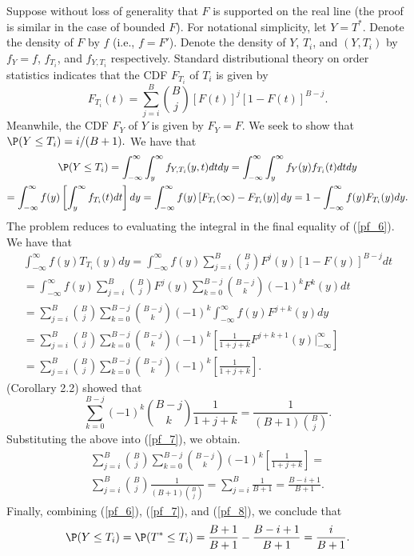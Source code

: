\documentclass[12pt]{article}
\begin{document}
Suppose without loss of generality that $F$ is supported on the real line (the proof is similar in the case of bounded $F$).  For notational simplicity, let $Y = T^*$. Denote the density of $F$ by $f$ (i.e., $f = F'$). Denote the density of $Y$, $T_i$, and $(Y,T_i)$ by $f_Y = f$, $f_{T_i}$, and $f_{Y, T_i}$ respectively. Standard distributional theory on order statistics indicates that the CDF $F_{T_i}$ of $T_i$ is given by $$ F_{T_i}(t) = \sum_{j=i}^B \binom{B}{j}[F(t)]^j [1 - F(t)]^{B-j}.$$ Meanwhile, the CDF $F_Y$ of $Y$ is given by $F_Y = F$. We seek to show that $\P(Y \leq T_i) = i/(B+1).$ We have that
\begin{multline}\label{pf_6}
\P(Y \leq T_i) = \int_{-\infty}^{\infty} \int_{y}^\infty f_{Y,T_i}(y,t) dt dy = \int_{-\infty}^{\infty} \int_{y}^\infty f_Y(y)f_{T_i}(t) dt dy \\ = \int_{-\infty}^\infty f(y) \left[\int_{y}^\infty f_{T_i}(t) dt \right] dy = \int_{-\infty}^\infty f(y) \left[ F_{T_i}(\infty) - F_{T_i}(y) \right] dy = 1 - \int_{-\infty}^\infty f(y) F_{T_i}(y)dy. 
\end{multline}
The problem reduces to evaluating the integral in the final equality of (\ref{pf_6}). We have that
\begin{multline}\label{pf_7}
\int_{-\infty}^\infty f(y) T_{T_i}(y) dy = \int_{-\infty}^\infty f(y) \sum_{j=i}^B \binom{B}{j}F^j(y) [1 - F(y)]^{B-j}dt \\ = \int_{-\infty}^\infty f(y) \sum_{j=i}^B \binom{B}{j} F^j(y) \sum_{k=0}^{B-j}\binom{B-j}{k} (-1)^k F^k(y) dt\\ = \sum_{j=i}^B \binom{B}{j} \sum_{k=0}^{B-j} \binom{B-j}{k}(-1)^k\int_{-\infty}^\infty f(y) F^{j+k}(y) dy \\ = \sum_{j=i}^B \binom{B}{j} \sum_{k=0}^{B-j} \binom{B-j}{k} (-1)^k \left[ \frac{1}{1+j+k} F^{j+k+1}(y)|^\infty_{-\infty} \right] \\ = \sum_{j=i}^B \binom{B}{j} \sum_{k=0}^{B-j} \binom{B-j}{k} (-1)^k \left[ \frac{1}{1+j+k}\right].
\end{multline}
\cite{Sury2004} (Corollary 2.2) showed that
$$ \sum_{k=0}^{B-j} (-1)^k \binom{B-j}{k} \frac{1}{1 + j + k} = \frac{1}{(B + 1) \binom{ B  }{j}}.$$
Substituting the above into (\ref{pf_7}), we obtain.
\begin{multline}\label{pf_8}
\sum_{j=i}^B \binom{B}{j} \sum_{k=0}^{B-j} \binom{B-j}{k} (-1)^k \left[ \frac{1}{1+j+k}\right] =  \\ \sum_{j=i}^B \binom{B}{j} \frac{1}{(B+1)\binom{B}{j}} = \sum_{j=i}^B \frac{1}{B+1} = \frac{B-i+1}{B+1}.
\end{multline}
Finally, combining (\ref{pf_6}), (\ref{pf_7}), and (\ref{pf_8}), we conclude that
$$\P(Y \leq T_i) = \P(T^* \leq T_i) = \frac{B+1}{B+1} - \frac{B-i+1}{B+1} = \frac{i}{B+1}.$$
\end{document}
